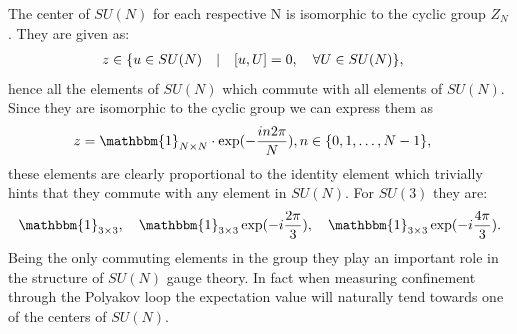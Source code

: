 \documentclass[english,twoside,openright]{UH_TCM_MSc}
\newcommand{\id}{\mathbbm{1}}
\begin{document}
The center of $SU(N)$ for each respective N is isomorphic to the cyclic group $Z_N$. They are given as:
\begin{align}
    z &\in \{ u \in SU(N) \hspace{10px}|\hspace{10px} [u,U] = 0,\hspace{10px} \forall U \in SU(N)\},
\end{align}
hence all the elements of $SU(N)$ which commute with all elements of $SU(N)$. Since they are isomorphic to the cyclic group we can express them as
\begin{align}
    z &= \id_{N\times N}\cdot \exp(-\frac{in2\pi}{N}), n\in \{0,1,\hdots,N-1\},
\end{align}
these elements are clearly proportional to the identity element which trivially hints that they commute with any element in $SU(N)$. For $SU(3)$ they are:
\begin{align}
    \id_{3\times 3}, \hspace{10px}\id_{3\times 3}\exp(-i\frac{2\pi}{3}), \hspace{10px}\id_{3\times 3}\exp(-i\frac{4\pi}{3}).
\end{align}
Being the only commuting elements in the group they play an important role in the structure of $SU(N)$ gauge theory. In fact when measuring confinement through the Polyakov loop the expectation value will naturally tend towards one of the centers of $SU(N)$. 
\end{document}
